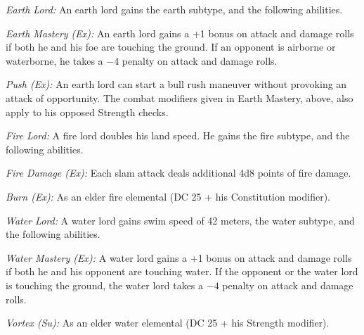 {\textit{Earth Lord:} An earth lord gains the earth subtype, and the following abilities.

\emph{Earth Mastery (Ex):} An earth lord gains a +1 bonus on attack and damage rolls if both he and his foe are touching the ground. If an opponent is airborne or waterborne, he takes a $-4$ penalty on attack and damage rolls.

\emph{Push (Ex):} An earth lord can start a bull rush maneuver without provoking an attack of opportunity. The combat modifiers given in Earth Mastery, above, also apply to his opposed Strength checks.


\textit{Fire Lord:} A fire lord doubles his land speed. He gains the fire subtype, and the following abilities.

\emph{Fire Damage (Ex):} Each slam attack deals additional 4d8 points of fire damage.

\emph{Burn (Ex):} As an elder fire elemental (DC 25 + his Constitution modifier).


\textit{Water Lord:} A water lord gains swim speed of 42 meters, the water subtype, and the following abilities.

\emph{Water Mastery (Ex):} A water lord gains a +1 bonus on attack and damage rolls if both he and his opponent are touching water. If the opponent or the water lord is touching the ground, the water lord takes a $-4$ penalty on attack and damage rolls.

\emph{Vortex (Su):} As an elder water elemental (DC 25 + his Strength modifier).

}

